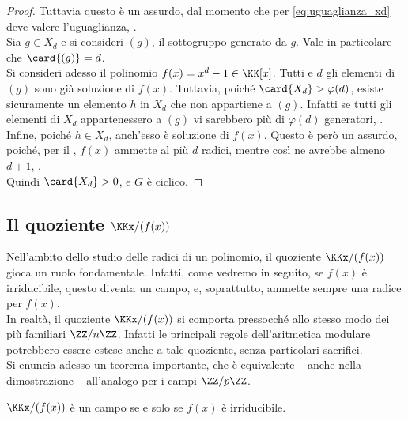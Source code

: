 \begin{proof}
    \vskip 0.1in

    Tuttavia questo è un assurdo, dal momento che per \eqref{eq:uguaglianza_xd}
    deve valere l'uguaglianza, \Lightning{}. \\

    Sia $g \in X_d$ e si consideri $(g)$, il sottogruppo generato da $g$.
    Vale in particolare che $\card{(g)} = d$. \\

    Si consideri adesso il polinomio $f(x)= x^d-1 \in \KK[x]$. Tutti e $d$ gli
    elementi di $(g)$ sono già soluzione di $f(x)$. Tuttavia, poiché
    $\card{X_d} > \varphi(d)$, esiste sicuramente un elemento $h$ in $X_d$ che
    non appartiene a $(g)$. Infatti se tutti gli elementi di $X_d$ appartenessero
    a $(g)$ vi sarebbero più di $\varphi(d)$ generatori, \Lightning{}. \\

    Infine, poiché $h \in X_d$, anch'esso è soluzione di $f(x)$. Questo è
    però un assurdo, poiché, per il , $f(x)$
    ammette al più $d$ radici, mentre così ne avrebbe almeno $d+1$, \Lightning{}. \\

    Quindi $\card{X_d}>0$, e $G$ è ciclico.
\end{proof}

\subsection{Il quoziente $\KKx/(f(x))$}

Nell'ambito dello studio delle radici di un polinomio,
il quoziente $\KKx/(f(x))$ gioca un ruolo fondamentale.
Infatti, come vedremo in seguito, se $f(x)$ è irriducibile,
questo diventa un campo, e, soprattutto, ammette sempre una
radice per $f(x)$. \\

In realtà, il quoziente $\KKx/(f(x))$ si comporta pressocché
allo stesso modo dei più familiari $\ZZ/n\ZZ$. Infatti
le principali regole dell'aritmetica modulare potrebbero
essere estese anche a tale quoziente, senza particolari
sacrifici. \\

Si enuncia adesso un teorema importante, che è equivalente --
anche nella dimostrazione -- all'analogo per i campi
$\ZZ/p\ZZ$.

\begin{theorem}
    \label{th:campo_quoziente_irriducibile}
    $\KKx/(f(x))$ è un campo se e solo se $f(x)$ è irriducibile.
\end{theorem}

